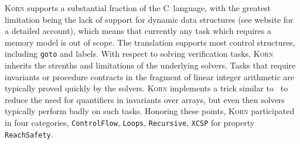 \documentclass{llncs}
\newcommand{\Korn}{\textsc{Korn}\xspace}
\begin{document}
\Korn supports a substantial fraction of the C~language, with the greatest limitation
being the lack of support for dynamic data structures (see website for a detailed account),
which means that currently any task which requires a memory model is out of scope.
The translation supports most control structures, including \texttt{goto} and labels.
With respect to solving verification tasks,
\Korn inherits the strenths and limitations of the underlying solvers.
Tasks that require invariants or procedure contracts in the fragment of linear integer arithmetic
are typically proved quickly by the solvers.
\Korn implements a trick similar to~\cite{monniaux2016cell}
to reduce the need for quantifiers in invariants over arrays,
but even then solvers typically perform badly on such tasks.
Honoring these points, \Korn participated in four categories,
\texttt{ControlFlow},
\texttt{Loops},
\texttt{Recursive},
\texttt{XCSP}
for property \texttt{ReachSafety}.
\end{document}
